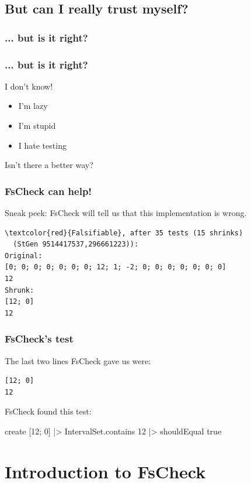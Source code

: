 \documentclass{beamer}
\begin{document}
\subsection{But can I really trust myself?}

\begin{frame}
\frametitle{... but is it right?}
\end{frame}

\begin{frame}
\frametitle{... but is it right?}

I don't know!

\begin{itemize}
\item I'm lazy
\item I'm stupid
\item I hate testing
\end{itemize}

Isn't there a better way?
\end{frame}

\begin{frame}[fragile]
\frametitle{FsCheck can help!}

Sneak peek: FsCheck will tell us that this implementation is wrong.

\begin{Verbatim}[commandchars=\\\{\}]
\textcolor{red}{Falsifiable}, after 35 tests (15 shrinks)
  (StGen 9514417537,296661223)):
Original:
[0; 0; 0; 0; 0; 0; 0; 12; 1; -2; 0; 0; 0; 0; 0; 0; 0]
12
Shrunk:
[12; 0]
12
\end{Verbatim}

\end{frame}

\begin{frame}[fragile]
\frametitle{FsCheck's test}
The last two lines FsCheck gave us were:
\begin{verbatim}
[12; 0]
12
\end{verbatim}

\pause

FsCheck found this test:

\begin{fslisting}
create [12; 0]
|> IntervalSet.contains 12
|> shouldEqual true
\end{fslisting}
\end{frame}

\section{Introduction to FsCheck}
\end{document}

